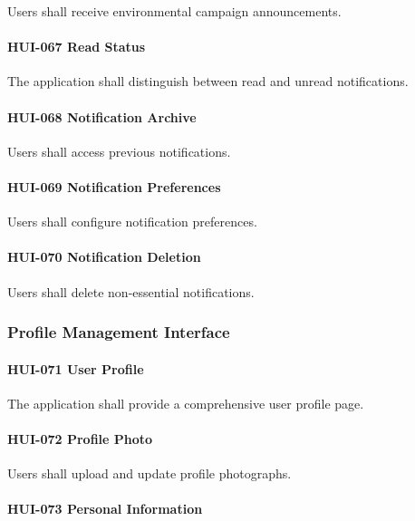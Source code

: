 Users shall receive environmental campaign announcements.

\paragraph{HUI-067 Read Status}

The application shall distinguish between read and unread
notifications.

\paragraph{HUI-068 Notification Archive}

Users shall access previous notifications.

\paragraph{HUI-069 Notification Preferences}

Users shall configure notification preferences.

\paragraph{HUI-070 Notification Deletion}

Users shall delete non-essential notifications.


\subsubsection*{Profile Management Interface}

\paragraph{HUI-071 User Profile}

The application shall provide a comprehensive user profile page.

\paragraph{HUI-072 Profile Photo}

Users shall upload and update profile photographs.

\paragraph{HUI-073 Personal Information}

